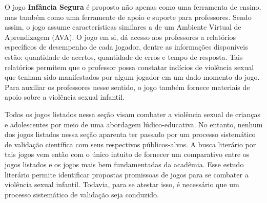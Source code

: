 O jogo \textbf{Infância Segura} é proposto não apenas como uma ferramenta de ensino, mas também como uma ferramente de apoio e suporte para professores. Sendo assim, o jogo assume características similares a de um Ambiente Virtual de Aprendizagem (AVA). O jogo em si, dá acesso aos professores a relatórios específicos de desempenho de cada jogador, dentre as informações disponíveis estão: quantidade de acertos, quantidade de erros e tempo de resposta. Tais relatórios permitem que o professor possa constatar indícios de violência sexual que tenham sido manifestados por algum jogador em um dado momento do jogo. Para auxiliar os professores nesse sentido, o jogo também fornece  materiais de apoio sobre a violência sexual infantil.


Todos os jogos listados nessa seção visam combater a violência sexual de crianças e adolescentes por meio de uma abordagem lúdico-educativa. No entanto, nenhum dos jogos listados nessa seção aparenta ter passado por um processo sistemático de validação científica com seus respectivos públicos-alvos. A busca literário por tais jogos vem então com o único intuito de fornecer um comparativo entre os jogos listados e os jogos mais bem fundamentadas da acadêmia. Esse estudo literário permite identificar propostas promissoas de jogos para se combater a violência sexual infantil. Todavia, para se atestar isso, é necessário que um processo sistemático de validação seja conduzido. 




